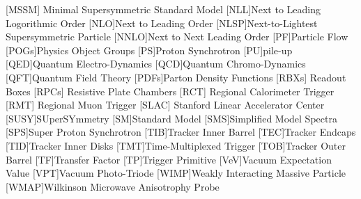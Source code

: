 \begin{acronym}[AAAAAAA]
 [MSSM] {Minimal Supersymmetric Standard Model}
[NLL]{Next to Leading Logorithmic Order}
[NLO]{Next to Leading Order}
[NLSP]{Next-to-Lightest Supersymmetric Particle}
[NNLO]{Next to Next Leading Order}
[PF]{Particle Flow}
[POGs]{Physics Object Groups}
[PS]{Proton Synchrotron}
[PU]{pile-up}
[QED]{Quantum Electro-Dynamics}
[QCD]{Quantum Chromo-Dynamics}
[QFT]{Quantum Field Theory}
[PDFs]{Parton Density Functions}
 [RBXs] {Readout Boxes}
 [RPCs] {Resistive Plate Chambers}
 [RCT] {Regional Calorimeter Trigger}
 [RMT] {Regional Muon Trigger}
 [SLAC] {Stanford Linear Accelerator Center}
[SUSY]{SUperSYmmetry}
[SM]{Standard Model}
[SMS]{Simplified Model Spectra}
[SPS]{Super Proton Synchrotron}
[TIB]{Tracker Inner Barrel} 
[TEC]{Tracker Endcaps} 
[TID]{Tracker Inner Disks}
[TMT]{Time-Multiplexed Trigger}
[TOB]{Tracker Outer Barrel} 
[TF]{Transfer Factor}
[TP]{Trigger Primitive}
[VeV]{Vacuum Expectation Value}
[VPT]{Vacuum Photo-Triode}
[WIMP]{Weakly Interacting Massive Particle}
[WMAP]{Wilkinson Microwave Anisotrophy Probe}

\end{acronym}

